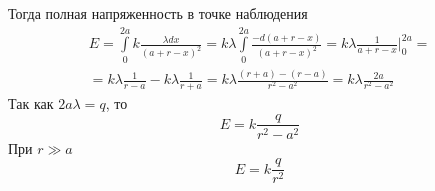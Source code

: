 \documentclass[a5paper,10pt]{article}
\begin{document}
Тогда полная напряженность в точке наблюдения
\begin{eqnarray}
	E=
	\int\limits_0^{2a}
	k\frac{\lambda dx}{(a+r-x)^2}=
	k\lambda\int\limits_0^{2a}
	\frac{-d(a+r-x)}{(a+r-x)^2}=
	k\lambda\frac{1}{a+r-x}\bigg|_0^{2a}=\\
	=k\lambda\frac{1}{r-a}-k\lambda\frac{1}{r+a}=
	k\lambda\frac{(r+a)-(r-a)}{r^2-a^2}=k\lambda\frac{2a}{r^2-a^2}
\end{eqnarray}
Так как $2a\lambda=q$, то
\begin{equation}
	E=k\frac{q}{r^2-a^2}
\end{equation}
При $r \gg a$
\begin{equation}
	E=
	k\frac{q}{r^2}
\end{equation}

\end{document}

